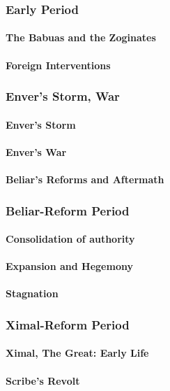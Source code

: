 	\subsubsection{Early Period}
		\paragraph{The Babuas and the Zoginates}
		\paragraph{Foreign Interventions}
	\subsubsection{Enver's Storm, War}
		\paragraph{Enver's Storm}
		\paragraph{Enver's War}
		\paragraph{Beliar's Reforms and Aftermath}
	\subsubsection{Beliar-Reform Period}
		\paragraph{Consolidation of authority}
		\paragraph{Expansion and Hegemony}
		\paragraph{Stagnation}
	\subsubsection{Ximal-Reform Period}
		\paragraph{Ximal, The Great: Early Life}
		\paragraph{Scribe's Revolt}
